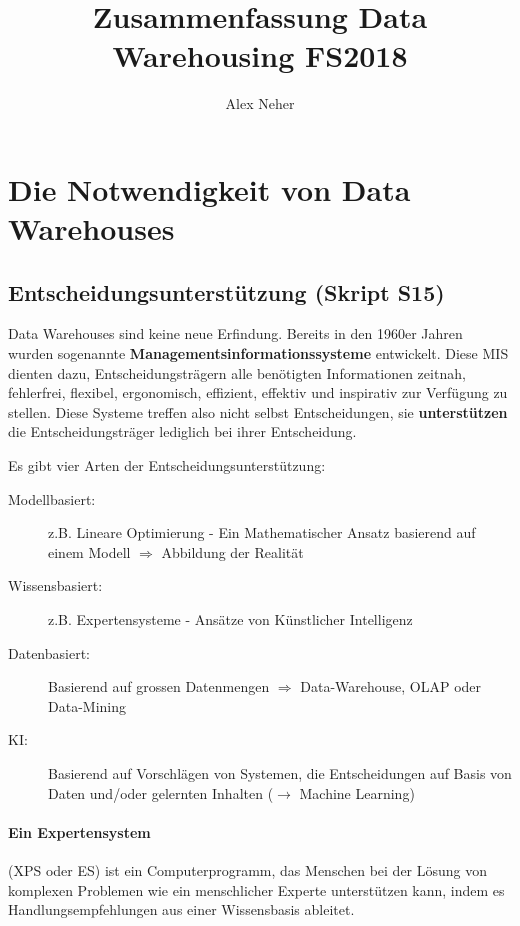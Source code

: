 \documentclass[a4paper, 11pt, nofootinbib]{article}
\begin{document}
\title{Zusammenfassung Data Warehousing FS2018}
\author{Alex Neher}
\maketitle

\tableofcontents
\newpage
\listoffigures
\newpage

\graphicspath{{./Pictures/}}

\section{Die Notwendigkeit von Data Warehouses}
\subsection{Entscheidungsunterstützung (Skript S15)}
Data Warehouses sind keine neue Erfindung. Bereits in den 1960er Jahren wurden sogenannte \textbf{Managementsinformationssysteme} entwickelt. Diese MIS dienten dazu, Entscheidungsträgern alle benötigten Informationen zeitnah, fehlerfrei, flexibel, ergonomisch, effizient, effektiv und inspirativ zur Verfügung zu stellen. Diese Systeme treffen also nicht selbst Entscheidungen, sie \textbf{unterstützen} die Entscheidungsträger lediglich bei ihrer Entscheidung.

Es gibt vier Arten der Entscheidungsunterstützung:

\begin{description}
	\item [Modellbasiert:] z.B. Lineare Optimierung - Ein Mathematischer Ansatz basierend auf einem Modell $\Longrightarrow$ Abbildung der Realität
	\item [Wissensbasiert: ] z.B. Expertensysteme - Ansätze von Künstlicher Intelligenz
	\item [Datenbasiert: ] Basierend auf grossen Datenmengen $\Longrightarrow$ Data-Warehouse, OLAP oder Data-Mining
	\item [KI: ] Basierend auf Vorschlägen von Systemen, die Entscheidungen auf Basis von Daten und/oder gelernten Inhalten ($\longrightarrow$ Machine Learning)
\end{description}


\paragraph{Ein Expertensystem}(XPS oder ES) ist ein Computerprogramm, das Menschen bei der Lösung von komplexen Problemen wie ein menschlicher Experte unterstützen kann, indem es Handlungsempfehlungen aus einer Wissensbasis ableitet.
\end{document}
